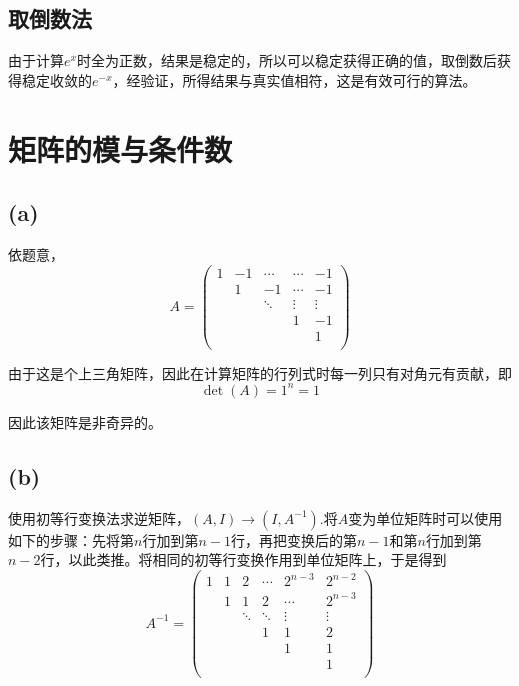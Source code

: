 \documentclass[UTF8]{ctexart}
\begin{document}
\subsection{取倒数法}
由于计算$e^x$时全为正数，结果是稳定的，所以可以稳定获得正确的值，取倒数后获得稳定收敛的$e^{-x}$，经验证，所得结果与真实值相符，这是有效可行的算法。

\section{矩阵的模与条件数}
\subsection*{(a)}
依题意，\begin{equation*}
    A=\begin{pmatrix}
        1 & -1 & \cdots& \cdots & -1\\
          &  1 & -1 & \cdots &-1\\
          &    &  \ddots & \vdots &\vdots\\
          &    &         & 1 & -1\\
          & & & & 1\\
    \end{pmatrix}
\end{equation*}

由于这是个上三角矩阵，因此在计算矩阵的行列式时每一列只有对角元有贡献，即\begin{equation*}
    \det(A) = 1^n = 1
\end{equation*}

因此该矩阵是非奇异的。

\subsection*{(b)}
使用初等行变换法求逆矩阵，$(A,I)\to (I,A^{-1})$.将$A$变为单位矩阵时可以使用如下的步骤：先将第$n$行加到第$n-1$行，再把变换后的第$n-1$和第$n$行加到第$n-2$行，以此类推。将相同的初等行变换作用到单位矩阵上，于是得到\begin{equation*}
    A^{-1}=\begin{pmatrix}
        1&1&2&\cdots &2^{n-3} & 2^{n-2}\\
         &1&1&2&\cdots &2^{n-3}\\
         & &\ddots&\ddots& \vdots &\vdots\\
         & &  &1 &1 & 2\\
         & & & & 1&1\\
         & &  & & &1\\
    \end{pmatrix}
\end{equation*}
\end{document}
